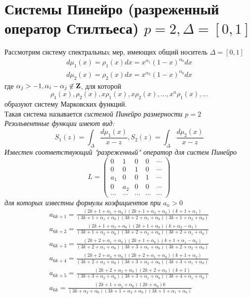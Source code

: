 \documentclass[12pt, a4paper]{report}
\begin{document}
\section{Системы Пинейро (разреженный оператор Стилтьеса) $p=2, \Delta=[0,1]$}
Рассмотрим систему спектральныx мер, имеющих общий носитель $\Delta=[0,1]$
$$
\begin{array}{llll}
d\mu_1(x)=\rho_1(x) dx = x^{\alpha_1}(1-x)^{\alpha_0} dx \\
d\mu_2(x)=\rho_2(x) dx = x^{\alpha_2}(1-x)^{\alpha_0} dx
\end{array}
$$
где $\alpha_j>-1, \alpha_i-\alpha_j \not \in \bf Z\rm$, для которой  
$$
\rho_1(x), \rho_2(x), x\rho_1(x), x\rho_2(x), \ldots, x^n\rho_1(x), \ldots
$$
образуют систему Марковских функций. \\
Такая система называется \it системой Пинейро \rm размерности $p=2$ \\
Резольвентные функции имеют вид:
$$
S_1(z)=\int_{\Delta} {\displaystyle \frac{d\mu_1(x)}{x-z}}, S_2(z)=\int_{\Delta} {\displaystyle \frac{d\mu_2(x)}{x-z}}
$$
Известен соответствующий "разреженный" оператор для систем Пинейро
\begin{equation}
L = \left(\begin{array}{ccccccc}
0 & 1 & 0 & 0 & \cdots \\
0 & 0 & 1 & 0 & \cdots \\
a_1 & 0 & 0 & 1 & \cdots \\
0 & a_2 & 0 & 0 & \cdots \\
\cdots & \cdots & \cdots & \cdots & \cdots 
\end{array}\right)
\end{equation}
для которых известны формулы коэфициентов при $a_n>0$ 
$$
\begin{array}{lllllllllllllll}
a_{6k+1}=\displaystyle
\frac
{(2k+1+\alpha_1+\alpha_0)(2k+1+\alpha_2+\alpha_0)(k+1+\alpha_1)}
{(3k+1+\alpha_1+\alpha_0)(3k+2+\alpha_1+\alpha_0)(3k+1+\alpha_2+\alpha_0)}
\\
a_{6k+2}=\displaystyle\frac
{(2k+1+\alpha_2+\alpha_0)(2k+1+\alpha_0)(k+\alpha_2-\alpha_1)}
{(3k+1+\alpha_2+\alpha_0)(3k+2+\alpha_2+\alpha_0)(3k+2+\alpha_1+\alpha_0)}
\\
a_{6k+3}=\displaystyle\frac
{(2k+2+\alpha_1+\alpha_0)(2k+1+\alpha_0)(k+1+\alpha_1-\alpha_2)}
{(3k+2+\alpha_1+\alpha_0)(3k+3+\alpha_1+\alpha_0)(3k+2+\alpha_2+\alpha_0)}
\\
a_{6k+4}=\displaystyle\frac
{(2k+2+\alpha_2+\alpha_0)(2k+2+\alpha_1+\alpha_0)(k+1+\alpha_2)}
{(3k+2+\alpha_2+\alpha_0)(3k+3+\alpha_2+\alpha_0)(3k+3+\alpha_1+\alpha_0)}
\\
a_{6k+5}=\displaystyle\frac
{(2k+2+\alpha_2+\alpha_0)(2k+2+\alpha_0)(k+1)}
{(3k+3+\alpha_2+\alpha_0)(3k+3+\alpha_1+\alpha_0)(3k+4+\alpha_1+\alpha_0)}
\\
a_{6k}=\displaystyle\frac {(2k+1+\alpha_1+\alpha_0)(2k+\alpha_0)k}
{(3k+\alpha_2+\alpha_0)(3k+1+\alpha_2+\alpha_0)(3k+1+\alpha_1+\alpha_0)}
\end{array}
$$
\end{document}
